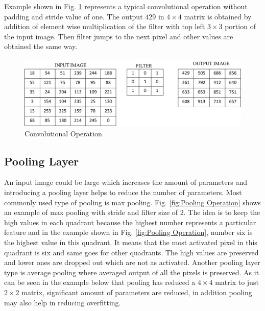 \documentclass[11pt]{article}
\begin{document}
Example shown in Fig. \ref{fig:Convolutional Operation} represents a typical convolutional operation without padding and stride value of one. The output $429$ in $4 \times 4$ matrix is obtained by addition of element wise multiplication of the filter with top left $3 \times 3$ portion of the input image. Then filter jumps to the next pixel and other values are obtained the same way.

\begin{figure}[H]
	\centering
	\includegraphics[width=.6\linewidth]{files/cnn_architecture/conv.png}
	\caption{Convolutional Operation}
	\label{fig:Convolutional Operation}
\end{figure}

\subsection{Pooling Layer}
An input image could be large which increases the amount of parameters and introducing a pooling layer helps to reduce the number of parameters. Most commonly used type of pooling is max pooling. Fig. \ref{fig:Pooling Operation} shows an example of max pooling with stride and filter size of 2. The idea is to keep the high values in each quadrant because the highest number represents a particular feature and in the example shown in Fig. \ref{fig:Pooling Operation}, number six is the highest value in this quadrant. It means that the most activated pixel in this quadrant is six and same goes for other quadrants. The high values are preserved and lower ones are dropped out which are not as activated. Another pooling layer type is average pooling where averaged output of all the pixels is preserved. As it can be seen in the example below that pooling has reduced a $4 \times 4$ matrix to just $2 \times 2$ matrix, significant amount of parameters are reduced, in addition pooling may also help in reducing overfitting.
\end{document}
